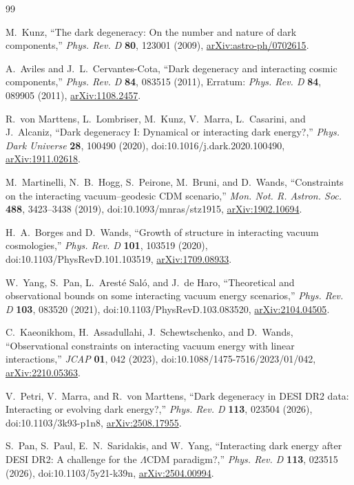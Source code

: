 \documentclass[11pt]{article}
\theoremstyle{remark}
\begin{document}
\begin{thebibliography}{99}

M.~Kunz,
``The dark degeneracy: On the number and nature of dark components,''
\emph{Phys. Rev. D} \textbf{80}, 123001 (2009),
\href{https://arxiv.org/abs/astro-ph/0702615}{arXiv:astro-ph/0702615}.

A.~Aviles and J.~L.~Cervantes-Cota,
``Dark degeneracy and interacting cosmic components,''
\emph{Phys. Rev. D} \textbf{84}, 083515 (2011),
Erratum: \emph{Phys. Rev. D} \textbf{84}, 089905 (2011),
\href{https://arxiv.org/abs/1108.2457}{arXiv:1108.2457}.

R.~von Marttens, L.~Lombriser, M.~Kunz, V.~Marra, L.~Casarini, and J.~Alcaniz,
``Dark degeneracy I: Dynamical or interacting dark energy?,''
\emph{Phys. Dark Universe} \textbf{28}, 100490 (2020),
doi:10.1016/j.dark.2020.100490,
\href{https://arxiv.org/abs/1911.02618}{arXiv:1911.02618}.

M.~Martinelli, N.~B.~Hogg, S.~Peirone, M.~Bruni, and D.~Wands,
``Constraints on the interacting vacuum--geodesic CDM scenario,''
\emph{Mon. Not. R. Astron. Soc.} \textbf{488}, 3423--3438 (2019),
doi:10.1093/mnras/stz1915,
\href{https://arxiv.org/abs/1902.10694}{arXiv:1902.10694}.

H.~A.~Borges and D.~Wands,
``Growth of structure in interacting vacuum cosmologies,''
\emph{Phys. Rev. D} \textbf{101}, 103519 (2020),
doi:10.1103/PhysRevD.101.103519,
\href{https://arxiv.org/abs/1709.08933}{arXiv:1709.08933}.

W.~Yang, S.~Pan, L.~Arest\'e Sal\'o, and J.~de Haro,
``Theoretical and observational bounds on some interacting vacuum energy scenarios,''
\emph{Phys. Rev. D} \textbf{103}, 083520 (2021),
doi:10.1103/PhysRevD.103.083520,
\href{https://arxiv.org/abs/2104.04505}{arXiv:2104.04505}.

C.~Kaeonikhom, H.~Assadullahi, J.~Schewtschenko, and D.~Wands,
``Observational constraints on interacting vacuum energy with linear interactions,''
\emph{JCAP} \textbf{01}, 042 (2023),
doi:10.1088/1475-7516/2023/01/042,
\href{https://arxiv.org/abs/2210.05363}{arXiv:2210.05363}.

V.~Petri, V.~Marra, and R.~von Marttens,
``Dark degeneracy in DESI DR2 data: Interacting or evolving dark energy?,''
\emph{Phys. Rev. D} \textbf{113}, 023504 (2026),
doi:10.1103/3k93-p1n8,
\href{https://arxiv.org/abs/2508.17955}{arXiv:2508.17955}.

S.~Pan, S.~Paul, E.~N.~Saridakis, and W.~Yang,
``Interacting dark energy after DESI DR2: A challenge for the $\Lambda$CDM paradigm?,''
\emph{Phys. Rev. D} \textbf{113}, 023515 (2026),
doi:10.1103/5y21-k39n,
\href{https://arxiv.org/abs/2504.00994}{arXiv:2504.00994}.

\end{thebibliography}
\end{document}
